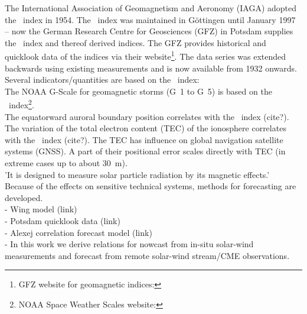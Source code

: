 The International Association of Geomagnetism and Aeronomy (IAGA) adopted the \Kp{}~index in 1954. The \Kp{}~index was maintained in Göttingen until January 1997 -- now the German Research Centre for Geosciences (GFZ) in Potsdam supplies the \Kp{}~index and thereof derived indices. The GFZ provides historical and quicklook data of the indices via their website\footnote{GFZ website for geomagnetic indices: }. The data series was extended backwards using existing measurements and is now available from 1932 onwards.\\

Several indicators/quantities are based on the \Kp{}~index:\\
The NOAA G-Scale for geomagnetic storms (G~1 to G~5) is based on the \Kp~index\footnote{NOAA Space Weather Scales website: }.\\
The equatorward auroral boundary position correlates with the \Kp~index (cite?).\\
The variation of the total electron content (TEC) of the ionosphere correlates with the \Kp~index (cite?). The TEC has influence on global navigation satellite systems (GNSS). A part of their positional error scales directly with TEC (in extreme cases up to about \SI{30}{\m}).\\

'It is designed to measure solar particle radiation by its magnetic effects.'\\

Because of the effects on sensitive technical systems, methods for \Kp{} forecasting are developed.\\
- Wing \Kp{} model (link)\\
- Potsdam quicklook data (link)\\
- Alexej \Kp{} correlation forecast model (link)\\
- In this work we derive relations for \Kp{} nowcast from in-situ solar-wind measurements and \Kp{} forecast from remote solar-wind stream/CME observations.\\



